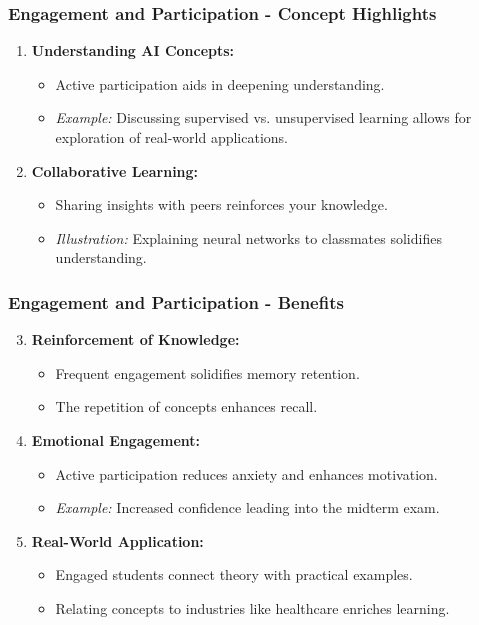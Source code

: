 \documentclass[aspectratio=169]{beamer}
\begin{document}
\begin{frame}[fragile]
    \frametitle{Engagement and Participation - Concept Highlights}
    \begin{enumerate}
        \item \textbf{Understanding AI Concepts:}
            \begin{itemize}
                \item Active participation aids in deepening understanding.
                \item \textit{Example:} Discussing supervised vs. unsupervised learning allows for exploration of real-world applications.
            \end{itemize}
        \item \textbf{Collaborative Learning:}
            \begin{itemize}
                \item Sharing insights with peers reinforces your knowledge.
                \item \textit{Illustration:} Explaining neural networks to classmates solidifies understanding.
            \end{itemize}
    \end{enumerate}
\end{frame}

\begin{frame}[fragile]
    \frametitle{Engagement and Participation - Benefits}
    \begin{enumerate}
        \setcounter{enumi}{2}  %
        \item \textbf{Reinforcement of Knowledge:}
            \begin{itemize}
                \item Frequent engagement solidifies memory retention.
                \item The repetition of concepts enhances recall.
            \end{itemize}
        \item \textbf{Emotional Engagement:}
            \begin{itemize}
                \item Active participation reduces anxiety and enhances motivation.
                \item \textit{Example:} Increased confidence leading into the midterm exam.
            \end{itemize}
        \item \textbf{Real-World Application:}
            \begin{itemize}
                \item Engaged students connect theory with practical examples.
                \item Relating concepts to industries like healthcare enriches learning.
            \end{itemize}
    \end{enumerate}
\end{frame}
\end{document}
